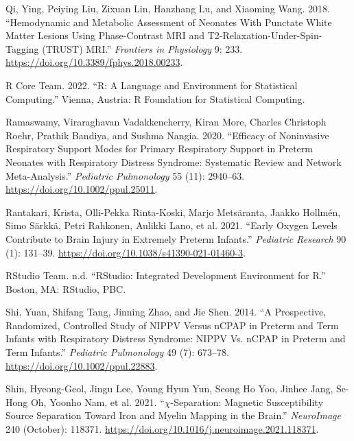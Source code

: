 \documentclass[
  letterpaper,
  DIV=11,
  numbers=noendperiod]{scrartcl}
\newlength{\cslhangindent}
\newenvironment{CSLReferences}[2] %
 {\begin{list}{}{%
  \setlength{\itemindent}{0pt}
  \setlength{\leftmargin}{0pt}
  \setlength{\parsep}{0pt}
  \ifodd #1
   \setlength{\leftmargin}{\cslhangindent}
   \setlength{\itemindent}{-1\cslhangindent}
  \fi
  \setlength{\itemsep}{#2\baselineskip}}}
 {\end{list}}
\begin{document}
\begin{CSLReferences}{1}{0}
Qi, Ying, Peiying Liu, Zixuan Lin, Hanzhang Lu, and Xiaoming Wang. 2018.
{``Hemodynamic and {Metabolic Assessment} of {Neonates With Punctate
White Matter Lesions Using Phase-Contrast MRI} and
{T2-Relaxation-Under-Spin-Tagging} ({TRUST}) {MRI}.''} \emph{Frontiers
in Physiology} 9: 233. \url{https://doi.org/10.3389/fphys.2018.00233}.

R Core Team. 2022. {``R: {A Language} and {Environment} for {Statistical
Computing}.''} Vienna, Austria: R Foundation for Statistical Computing.

Ramaswamy, Viraraghavan Vadakkencherry, Kiran More, Charles Christoph
Roehr, Prathik Bandiya, and Sushma Nangia. 2020. {``Efficacy of
Noninvasive Respiratory Support Modes for Primary Respiratory Support in
Preterm Neonates with Respiratory Distress Syndrome: {Systematic} Review
and Network Meta-Analysis.''} \emph{Pediatric Pulmonology} 55 (11):
2940--63. \url{https://doi.org/10.1002/ppul.25011}.

Rantakari, Krista, Olli-Pekka Rinta-Koski, Marjo Metsäranta, Jaakko
Hollmén, Simo Särkkä, Petri Rahkonen, Aulikki Lano, et al. 2021.
{``Early Oxygen Levels Contribute to Brain Injury in Extremely Preterm
Infants.''} \emph{Pediatric Research} 90 (1): 131--39.
\url{https://doi.org/10.1038/s41390-021-01460-3}.

RStudio Team. n.d. {``{RStudio}: {Integrated Development Environment}
for {R}.''} Boston, MA: RStudio, PBC.

Shi, Yuan, Shifang Tang, Jinning Zhao, and Jie Shen. 2014. {``A
Prospective, Randomized, Controlled Study of {NIPPV} Versus {nCPAP} in
Preterm and Term Infants with Respiratory Distress Syndrome: {NIPPV} Vs.
{nCPAP} in {Preterm} and {Term Infants}.''} \emph{Pediatric Pulmonology}
49 (7): 673--78. \url{https://doi.org/10.1002/ppul.22883}.

Shin, Hyeong-Geol, Jingu Lee, Young Hyun Yun, Seong Ho Yoo, Jinhee Jang,
Se-Hong Oh, Yoonho Nam, et al. 2021. {``{\(\chi\)}-Separation:
{Magnetic} Susceptibility Source Separation Toward Iron and Myelin
Mapping in the Brain.''} \emph{NeuroImage} 240 (October): 118371.
\url{https://doi.org/10.1016/j.neuroimage.2021.118371}.


\end{CSLReferences}
\end{document}
